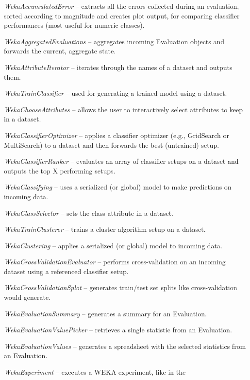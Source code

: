 \begin{tight_itemize}
	\item \textit{WekaAccumulatedError} -- extracts all the errors
	collected during an evaluation, sorted according to magnitude and
	creates plot output, for comparing classifier performances (most useful
	for numeric classes).
	\item \textit{WekaAggregatedEvaluations} -- aggregates incoming
	Evaluation objects and forwards the current, aggregate state. 
	\item \textit{WekaAttributeIterator} -- iterates through the names of a
	dataset and outputs them.
	\item \textit{WekaTrainClassifier} -- used for generating a trained
	model using a dataset.
	\item \textit{WekaChooseAttributes} -- allows the user to interactively
	select attributes to keep in a dataset.
	\item \textit{WekaClassifierOptimizer} -- applies a classifier optimizer
	(e.g., GridSearch or MultiSearch) to a dataset and then forwards the best
	(untrained) setup.
	\item \textit{WekaClassifierRanker} -- evaluates an array of classifier
	setups on a dataset and outputs the top X performing setups.
	\item \textit{WekaClassifying} -- uses a serialized (or global) model to
	make predictions on incoming data.
	\item \textit{WekaClassSelector} -- sets the class attribute in a dataset.
	\item \textit{WekaTrainClusterer} -- trains a cluster algorithm setup
	on a dataset.
	\item \textit{WekaClustering} -- applies a serialized (or global) model
	to incoming data.
	\item \textit{WekaCrossValidationEvaluator} -- performs cross-validation
	on an incoming dataset using a referenced classifier setup.
	\item \textit{WekaCrossValidationSplot} -- generates train/test set splits
	like cross-validation would generate.
	\item \textit{WekaEvaluationSummary} -- generates a summary for an 
	Evaluation.
	\item \textit{WekaEvaluationValuePicker} -- retrieves a single statistic
	from an Evaluation.
	\item \textit{WekaEvaluationValues} -- generates a spreadsheet with the
	selected statistics from an Evaluation.
	\item \textit{WekaExperiment} -- executes a WEKA experiment, like in the 

\end{tight_itemize}
